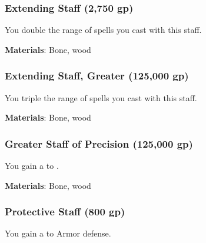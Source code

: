 
\lowercase{\hypertarget{item:Extending Staff}{}}\label{item:Extending Staff}
\hypertarget{item:Extending Staff}{\subsubsection{Extending Staff\hfill{} (2,750 gp)}}

You double the range of spells you cast with this staff.



\vspace{0.25em}
\textbf{Materials}: Bone, wood


\lowercase{\hypertarget{item:Extending Staff, Greater}{}}\label{item:Extending Staff, Greater}
\hypertarget{item:Extending Staff, Greater}{\subsubsection{Extending Staff, Greater\hfill{} (125,000 gp)}}

You triple the range of spells you cast with this staff.



\vspace{0.25em}
\textbf{Materials}: Bone, wood


\lowercase{\hypertarget{item:Greater Staff of Precision}{}}\label{item:Greater Staff of Precision}
\hypertarget{item:Greater Staff of Precision}{\subsubsection{Greater Staff of Precision\hfill{} (125,000 gp)}}

You gain a   to .



\vspace{0.25em}
\textbf{Materials}: Bone, wood


\lowercase{\hypertarget{item:Protective Staff}{}}\label{item:Protective Staff}
\hypertarget{item:Protective Staff}{\subsubsection{Protective Staff\hfill{} (800 gp)}}

You gain a   to Armor defense.



